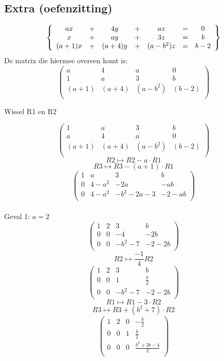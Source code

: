 \documentclass[lineaire_algebra_oplossingen.tex]{subfiles}
\begin{document}
\subsection{Extra (oefenzitting)}
\[
\left\lbrace
\begin{array}{c c c c c c c}
ax &+& 4y &+& az &=& 0\\
x  &+& ay &+& 3z &=& b\\
(a+1)x &+& (a+4)y &+& (a-b^{2})z &=& b-2
\end{array}
\right\rbrace
\]
De matrix die hiermee overeen komt is:
\[
\begin{pmatrix}
a & 4 & a & 0\\
1 & a & 3 & b\\
(a+1) & (a+4) & (a-b^{2}) & (b-2)\\
\end{pmatrix}
\]
\begin{center}
Wissel R1 en R2
\end{center}
\[
\begin{pmatrix}
1 & a & 3 & b\\
a & 4 & a & 0\\
(a+1) & (a+4) & (a-b^{2}) & (b-2)\\
\end{pmatrix}
\]
\[ R2 \longmapsto R2 - a\cdot R1 \]
\[ R3 \longmapsto R3 - (a+1)\cdot R1 \]
\[
\begin{pmatrix}
1 & a & 3 & b\\
0 & 4-a^{2} & -2a & -ab\\
0 & 4-a^{2} & -b^{2}-2a-3 & -2-ab\\
\end{pmatrix}
\]
\\Geval 1: $a=2$
\[
\begin{pmatrix}
1 & 2 & 3 & b\\
0 & 0 & -4 & -2b\\
0 & 0 & -b^{2}-7 & -2-2b\\
\end{pmatrix}
\]
\[ R2 \longmapsto \frac{-1}{4}R2 \]
\[
\begin{pmatrix}
1 & 2 & 3 & b\\
0 & 0 & 1 & \frac{b}{2}\\
0 & 0 & -b^{2}-7 & -2-2b\\
\end{pmatrix}
\]
\[ R1 \longmapsto R1 - 3\cdot R2 \]
\[ R3 \longmapsto R3 + (b^{2}+7)\cdot R2 \]
\[
\begin{pmatrix}
1 & 2 & 0 & -\frac{b}{2}\\
0 & 0 & 1 & \frac{b}{2}\\
0 & 0 & 0 & \frac{b^{3}+3b-4}{2}\\
\end{pmatrix}
\]
\end{document}
